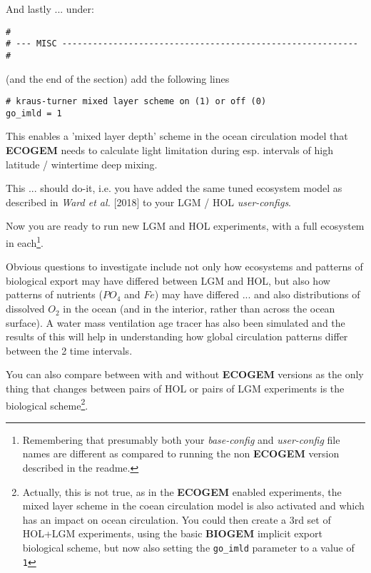\documentclass[11pt,fleqn]{book} %
\begin{document}
\begin{enumerate}[noitemsep]
And lastly ... under:
\footnotesize\begin{verbatim}
#
# --- MISC ----------------------------------------------------------
#
\end{verbatim}\normalsize

(and the end of the section) add the following lines
\vspace{-1mm}\begin{verbatim}
# kraus-turner mixed layer scheme on (1) or off (0)
go_imld = 1
\end{verbatim}\vspace{-1mm}
This enables a 'mixed layer depth' scheme in the ocean circulation model that \textbf{ECOGEM} needs to calculate light limitation during esp. intervals of high latitude / wintertime deep mixing.

This ... should do-it, i.e. you have added the same tuned ecosystem model as described in \textit{Ward et al.} [2018] to your LGM / HOL \textit{user-configs}.

\end{enumerate}

\vspace{1mm}

Now you are ready to run new LGM and HOL experiments, with a full ecosystem in each\footnote{Remembering that presumably both your \textit{base-config} and \textit{user-config} file names are  different as compared to running the non \textbf{ECOGEM} version described in the \textsf{\footnotesize readme}.}.
\vspace{1mm}

Obvious questions to investigate include not only how ecosystems and patterns of biological export may have differed between LGM and HOL, but also how patterns of nutrients (\(PO_{4}\) and \(Fe\)) may have differed ... and also distributions of dissolved \(O_{2}\) in the ocean (and in the interior, rather than across the ocean surface). A water mass ventilation age tracer has also been simulated and the results of this will help in understanding how global circulation patterns differ between the 2 time intervals.

You can also compare between with and without \textbf{ECOGEM} versions as the only thing that changes between pairs of HOL or pairs of LGM experiments is the biological scheme\footnote{Actually, this is not true, as in the \textbf{ECOGEM} enabled experiments, the mixed layer scheme in the coean circulation model is also activated and which has an impact on ocean circulation. You could then create a 3rd set of HOL+LGM experiments, using the basic \textbf{BIOGEM} implicit export biological scheme, but now also setting the \texttt{go\_imld} parameter to a value of \texttt{1}}.
\end{document}
